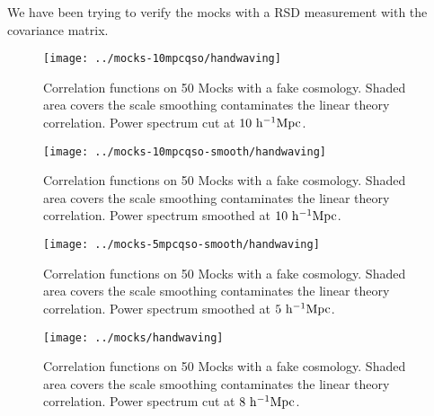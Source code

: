 \documentclass{paper}
\begin{document}
    We have been trying to verify the mocks with a RSD
    measurement with the covariance matrix. 
    \begin{figure}
        \texttt{[image: ../mocks-10mpcqso/handwaving]}
        \caption{Correlation functions on 50 Mocks with a
        fake cosmology. Shaded area covers the scale
        smoothing contaminates the linear theory
        correlation. Power spectrum cut at $10\,\mpch$.  }
        \label{fig:handwave-1}
    \end{figure}
    \begin{figure}
        \texttt{[image: ../mocks-10mpcqso-smooth/handwaving]}
        \caption{Correlation functions on 50 Mocks with a
        fake cosmology. Shaded area covers the scale
        smoothing contaminates the linear theory
    correlation. Power spectrum smoothed at $10\,\mpch$. }
        \label{fig:handwave-2}
    \end{figure}
    \begin{figure}
        \texttt{[image: ../mocks-5mpcqso-smooth/handwaving]}
        \caption{Correlation functions on 50 Mocks with a
        fake cosmology. Shaded area covers the scale
        smoothing contaminates the linear theory
    correlation. Power spectrum smoothed at $5\,\mpch$.  }
        \label{fig:handwave-3}
    \end{figure}
    \begin{figure}
        \texttt{[image: ../mocks/handwaving]}
        \caption{Correlation functions on 50 Mocks with a
        fake cosmology. Shaded area covers the scale
        smoothing contaminates the linear theory
    correlation. Power spectrum cut at $8\,\mpch$.  }
        \label{fig:handwave-4}
    \end{figure}
\end{document}
